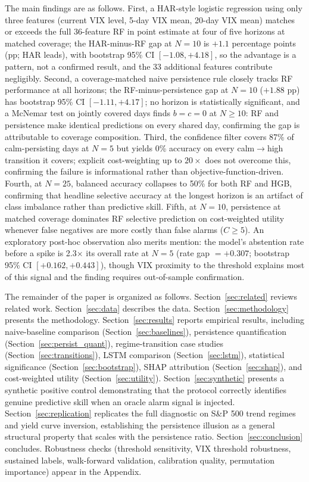 \documentclass[11pt]{article}
\begin{document}
The main findings are as follows. First, a HAR-style logistic regression using only three features (current VIX level, 5-day VIX mean, 20-day VIX mean) matches or exceeds the full 36-feature RF in point estimate at four of five horizons at matched coverage; the HAR-minus-RF gap at $N = 10$ is $+1.1$ percentage points (pp; HAR leads), with bootstrap 95\% CI $[-1.08, +4.18]$, so the advantage is a pattern, not a confirmed result, and the 33 additional features contribute negligibly. Second, a coverage-matched naive persistence rule closely tracks RF performance at all horizons; the RF-minus-persistence gap at $N = 10$ ($+1.88$ pp) has bootstrap 95\% CI $[-1.11, +4.17]$; no horizon is statistically significant, and a McNemar test on jointly covered days finds $b = c = 0$ at $N \geq 10$: RF and persistence make identical predictions on every shared day, confirming the gap is attributable to coverage composition. Third, the confidence filter covers 87\% of calm-persisting days at $N = 5$ but yields 0\% accuracy on every calm$\to$high transition it covers; explicit cost-weighting up to $20{\times}$ does not overcome this, confirming the failure is informational rather than objective-function-driven. Fourth, at $N = 25$, balanced accuracy collapses to 50\% for both RF and HGB, confirming that headline selective accuracy at the longest horizon is an artifact of class imbalance rather than predictive skill. Fifth, at $N = 10$, persistence at matched coverage dominates RF selective prediction on cost-weighted utility whenever false negatives are more costly than false alarms ($C \geq 5$). An exploratory post-hoc observation also merits mention: the model's abstention rate before a spike is 2.3$\times$ its overall rate at $N = 5$ (rate gap $= +0.307$; bootstrap 95\% CI $[+0.162, +0.443]$), though VIX proximity to the threshold explains most of this signal and the finding requires out-of-sample confirmation.

The remainder of the paper is organized as follows. Section~\ref{sec:related} reviews related work. Section~\ref{sec:data} describes the data. Section~\ref{sec:methodology} presents the methodology. Section~\ref{sec:results} reports empirical results, including naive-baseline comparison (Section~\ref{sec:baselines}), persistence quantification (Section~\ref{sec:persist_quant}), regime-transition case studies (Section~\ref{sec:transitions}), LSTM comparison (Section~\ref{sec:lstm}), statistical significance (Section~\ref{sec:bootstrap}), SHAP attribution (Section~\ref{sec:shap}), and cost-weighted utility (Section~\ref{sec:utility}). Section~\ref{sec:synthetic} presents a synthetic positive control demonstrating that the protocol correctly identifies genuine predictive skill when an oracle alarm signal is injected. Section~\ref{sec:replication} replicates the full diagnostic on S\&P 500 trend regimes and yield curve inversion, establishing the persistence illusion as a general structural property that scales with the persistence ratio. Section~\ref{sec:conclusion} concludes. Robustness checks (threshold sensitivity, VIX threshold robustness, sustained labels, walk-forward validation, calibration quality, permutation importance) appear in the Appendix.
\end{document}
